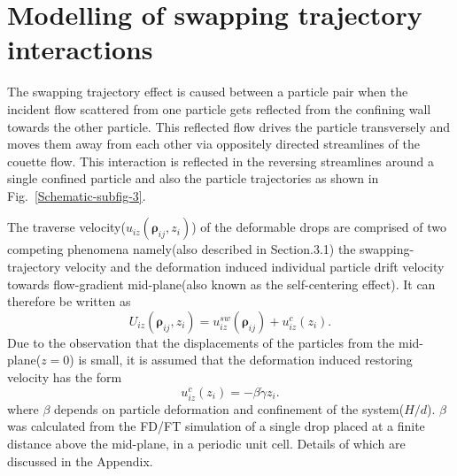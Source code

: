 \section{Modelling of swapping trajectory interactions}

The swapping trajectory effect is caused between a particle pair when the incident flow scattered from one particle gets reflected from the confining wall towards the other particle\cite{Reference27}. This reflected flow drives the particle transversely and moves them away from each other via oppositely directed streamlines of the couette flow. This interaction is reflected in the reversing streamlines around a single confined particle and also the particle trajectories as shown in Fig.~\ref{Schematic-subfig-3}.

The traverse velocity($u_{iz}(\bm{\rho}_{ij},z_i)$) of the deformable drops are comprised of two competing phenomena namely(also described in Section.3.1) the swapping-trajectory velocity and the deformation induced individual particle drift velocity towards flow-gradient mid-plane(also known as the self-centering effect). It can therefore be written as
\begin{equation}
 U_{iz}(\bm{\rho}_{ij},z_i) = u_{iz}^{sw}(\bm{\rho}_{ij}) + u_{iz}^c(z_i).
\end{equation}
Due to the observation that the displacements of the particles from the mid-plane($z=0$) is small, it is assumed that the deformation induced restoring velocity has the form
\begin{equation}
  u_{iz}^c(z_i) = -\beta \dot{\gamma}z_i.
  \label{deformation velocity}
\end{equation}
where $\beta$ depends on particle deformation and confinement of the system($H/d$). $\beta$ was calculated from the FD/FT simulation of a single drop placed at a finite distance above the mid-plane, in a periodic unit cell. Details of which are discussed in the Appendix.

